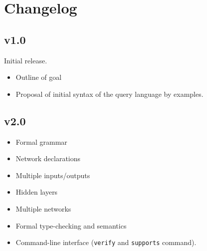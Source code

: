 \chapter{Changelog}
\label{sec:changelog}

\section*{v1.0}

Initial release.
\begin{itemize}
\item Outline of goal
\item Proposal of initial syntax of the query language by examples.
\end{itemize}

\section*{v2.0}

\begin{itemize}
\item Formal grammar
\item Network declarations
\item Multiple inputs/outputs
\item Hidden layers
\item Multiple networks
\item Formal type-checking and semantics
\item Command-line interface (\texttt{verify} and \texttt{supports} command).
\end{itemize}
